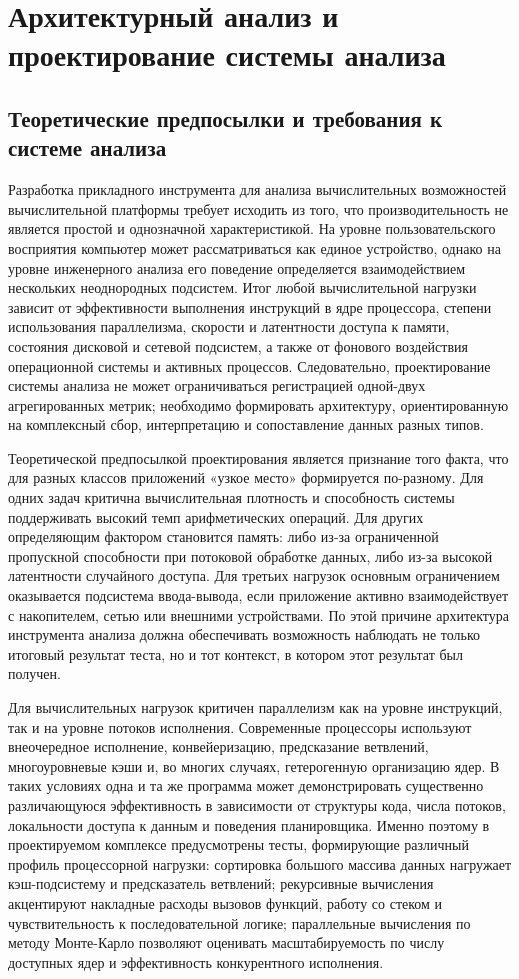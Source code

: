 \chapter{Архитектурный анализ и проектирование системы анализа}
\label{ch:design}

\section{Теоретические предпосылки и требования к системе анализа}

Разработка прикладного инструмента для анализа вычислительных возможностей вычислительной платформы требует исходить из того, что производительность не является простой и однозначной характеристикой. На уровне пользовательского восприятия компьютер может рассматриваться как единое устройство, однако на уровне инженерного анализа его поведение определяется взаимодействием нескольких неоднородных подсистем. Итог любой вычислительной нагрузки зависит от эффективности выполнения инструкций в ядре процессора, степени использования параллелизма, скорости и латентности доступа к памяти, состояния дисковой и сетевой подсистем, а также от фонового воздействия операционной системы и активных процессов. Следовательно, проектирование системы анализа не может ограничиваться регистрацией одной-двух агрегированных метрик; необходимо формировать архитектуру, ориентированную на комплексный сбор, интерпретацию и сопоставление данных разных типов.

Теоретической предпосылкой проектирования является признание того факта, что для разных классов приложений «узкое место» формируется по-разному. Для одних задач критична вычислительная плотность и способность системы поддерживать высокий темп арифметических операций. Для других определяющим фактором становится память: либо из-за ограниченной пропускной способности при потоковой обработке данных, либо из-за высокой латентности случайного доступа. Для третьих нагрузок основным ограничением оказывается подсистема ввода-вывода, если приложение активно взаимодействует с накопителем, сетью или внешними устройствами. По этой причине архитектура инструмента анализа должна обеспечивать возможность наблюдать не только итоговый результат теста, но и тот контекст, в котором этот результат был получен.

Для вычислительных нагрузок критичен параллелизм как на уровне инструкций, так и на уровне потоков исполнения. Современные процессоры используют внеочередное исполнение, конвейеризацию, предсказание ветвлений, многоуровневые кэши и, во многих случаях, гетерогенную организацию ядер. В таких условиях одна и та же программа может демонстрировать существенно различающуюся эффективность в зависимости от структуры кода, числа потоков, локальности доступа к данным и поведения планировщика. Именно поэтому в проектируемом комплексе предусмотрены тесты, формирующие различный профиль процессорной нагрузки: сортировка большого массива данных нагружает кэш-подсистему и предсказатель ветвлений; рекурсивные вычисления акцентируют накладные расходы вызовов функций, работу со стеком и чувствительность к последовательной логике; параллельные вычисления по методу Монте-Карло позволяют оценивать масштабируемость по числу доступных ядер и эффективность конкурентного исполнения.

